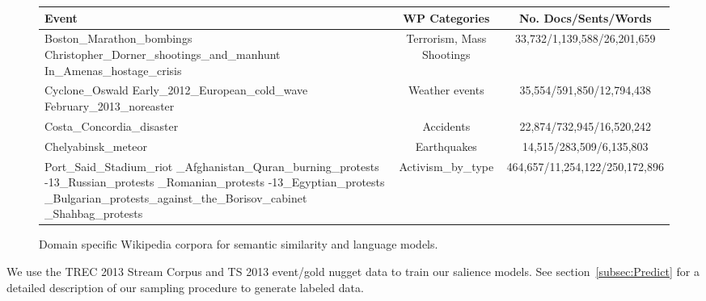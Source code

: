 \documentclass{sig-alternate}
\begin{document}
\begin{figure*}
	\begin{center}
\begin{tabular}{| p{5cm} c c |}
\hline
Event & WP Categories & No. Docs/Sents/Words\\
\hline \hline
Boston\_Marathon\_bombings \newline
Christopher\_Dorner\_shootings\_and\_manhunt \newline 
 In\_Amenas\_hostage\_crisis
& Terrorism, Mass Shootings & 33,732/1,139,588/26,201,659  \\
\hline
 Cyclone\_Oswald \newline
Early\_2012\_European\_cold\_wave \newline
February\_2013\_noreaster \newline & Weather events & 35,554/591,850/12,794,438  \\
\hline
Costa\_Concordia\_disaster & Accidents & 22,874/732,945/16,520,242 \\
\hline
Chelyabinsk\_meteor & Earthquakes & 14,515/283,509/6,135,803  \\
\hline
Port\_Said\_Stadium\_riot \newline
2012\_Afghanistan\_Quran\_burning\_protests \newline
2011-13\_Russian\_protests \newline
2012\_Romanian\_protests \newline
2012-13\_Egyptian\_protests \newline
2013\_Bulgarian\_protests\_against\_the\_Borisov\_cabinet \newline
2013\_Shahbag\_protests & Activism\_by\_type & 464,657/11,254,122/250,172,896  \\
\hline
\end{tabular}
\caption{Domain specific Wikipedia corpora for semantic similarity and 
language models. }
\end{center}
\end{figure*} 


We use the TREC 2013 Stream Corpus and TS 2013 event/gold nugget data to 
train our salience models. See section~\cref{subsec:Predict} 
for a detailed description of our sampling procedure to generate labeled
data.
\end{document}
